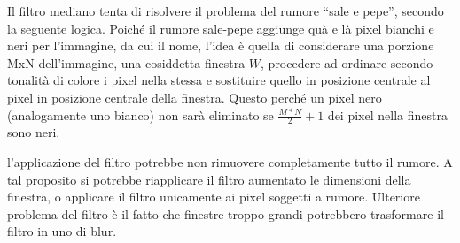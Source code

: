 \documentclass{subfiles}
\begin{document}
Il filtro mediano tenta di risolvere il problema del rumore ``sale e pepe'', secondo la seguente logica.
Poiché il rumore sale-pepe aggiunge quà e là pixel bianchi e neri per l'immagine, da cui il nome,
l'idea è quella di considerare una porzione MxN dell'immagine, una cosiddetta finestra \(W\),
procedere ad ordinare secondo tonalità di colore i pixel nella stessa e sostituire quello in posizione centrale al pixel in posizione centrale della finestra.
Questo perché un pixel nero (analogamente uno bianco) non sarà eliminato se \(\tfrac{M * N}{2} + 1\) dei pixel nella finestra sono neri.


\begin{Remark*}
    l'applicazione del filtro potrebbe non rimuovere completamente tutto il rumore.
    A tal proposito si potrebbe riapplicare il filtro aumentato le dimensioni della finestra, o applicare il filtro unicamente ai pixel soggetti a rumore.
    Ulteriore problema del filtro è il fatto che finestre troppo grandi potrebbero trasformare il filtro in uno di blur.
\end{Remark*}
\end{document}
